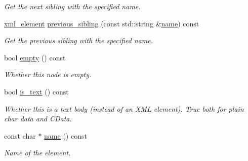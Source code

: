 \begin{DoxyCompactItemize}
\begin{DoxyCompactList}\small\item\em Get the next sibling with the specified name. \end{DoxyCompactList}\item 
\mbox{\label{classlsl_1_1xml__element_a70b90853b7edfaebfe69bc1103ed6b8b}} 
\hyperlink{classlsl_1_1xml__element}{xml\+\_\+element} \hyperlink{classlsl_1_1xml__element_a70b90853b7edfaebfe69bc1103ed6b8b}{previous\+\_\+sibling} (const std\+::string \&\hyperlink{classlsl_1_1xml__element_a2e449e85b7e763b1d0db4bb19d2eb7c2}{name}) const
\begin{DoxyCompactList}\small\item\em Get the previous sibling with the specified name. \end{DoxyCompactList}\item 
\mbox{\label{classlsl_1_1xml__element_a787dcaf85abcc5cd4d5f93fc80c82eb5}} 
bool \hyperlink{classlsl_1_1xml__element_a787dcaf85abcc5cd4d5f93fc80c82eb5}{empty} () const
\begin{DoxyCompactList}\small\item\em Whether this node is empty. \end{DoxyCompactList}\item 
\mbox{\label{classlsl_1_1xml__element_a965cfff9a29ebe6d8274f5256ff0017c}} 
bool \hyperlink{classlsl_1_1xml__element_a965cfff9a29ebe6d8274f5256ff0017c}{is\+\_\+text} () const
\begin{DoxyCompactList}\small\item\em Whether this is a text body (instead of an X\+ML element). True both for plain char data and C\+Data. \end{DoxyCompactList}\item 
\mbox{\label{classlsl_1_1xml__element_a2e449e85b7e763b1d0db4bb19d2eb7c2}} 
const char $\ast$ \hyperlink{classlsl_1_1xml__element_a2e449e85b7e763b1d0db4bb19d2eb7c2}{name} () const
\begin{DoxyCompactList}\small\item\em Name of the element. \end{DoxyCompactList}\item 
\mbox{\label{classlsl_1_1xml__element_a1a5e666b35c5d7262e4ffbda86b57f73}} 

\end{DoxyCompactItemize}
